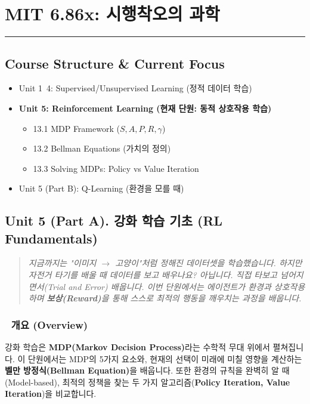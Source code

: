 \documentclass[11pt,a4paper]{book}
\theoremstyle{definition}
\begin{document}
\chapter{MIT 6.86x: 시행착오의 과학}
\label{ch:lecture13}


\vspace{1cm}
\hrule
\vspace{1cm}

\section*{Course Structure \& Current Focus}
\begin{itemize}
    \item Unit 1~4: Supervised/Unsupervised Learning (정적 데이터 학습)
    \item \textbf{\textcolor{mainblue}{Unit 5: Reinforcement Learning (현재 단원: 동적 상호작용 학습)}}
    \begin{itemize}
        \item 13.1 MDP Framework ($S, A, P, R, \gamma$)
        \item 13.2 Bellman Equations (가치의 정의)
        \item 13.3 Solving MDPs: Policy vs Value Iteration
    \end{itemize}
    \item Unit 5 (Part B): Q-Learning (환경을 모를 때)
\end{itemize}


\section{Unit 5 (Part A). 강화 학습 기초 (RL Fundamentals)}

\begin{quote}
\textit{지금까지는 "이미지 $\to$ 고양이"처럼 정해진 데이터셋을 학습했습니다. 하지만 자전거 타기를 배울 때 데이터를 보고 배우나요? 아닙니다. 직접 타보고 넘어지면서(Trial and Error) 배웁니다. 이번 단원에서는 에이전트가 환경과 상호작용하며 \textbf{보상(Reward)}을 통해 스스로 최적의 행동을 깨우치는 과정을 배웁니다.}
\end{quote}

\subsection*{📌 개요 (Overview)}
강화 학습은 \textbf{MDP(Markov Decision Process)}라는 수학적 무대 위에서 펼쳐집니다. 이 단원에서는 MDP의 5가지 요소와, 현재의 선택이 미래에 미칠 영향을 계산하는 \textbf{벨만 방정식(Bellman Equation)}을 배웁니다. 또한 환경의 규칙을 완벽히 알 때(Model-based), 최적의 정책을 찾는 두 가지 알고리즘(\textbf{Policy Iteration, Value Iteration})을 비교합니다.
\end{document}
